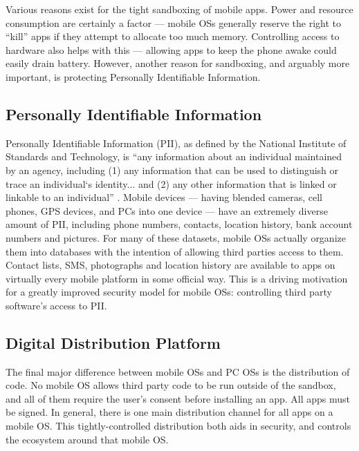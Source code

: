 Various reasons exist for the tight sandboxing of mobile apps. Power and resource consumption are certainly a factor --- mobile OSs generally reserve the right to ``kill'' apps if they attempt to allocate too much memory. Controlling access to hardware also helps with this --- allowing apps to keep the phone awake could easily drain battery. However, another reason for sandboxing, and arguably more important, is protecting Personally Identifiable Information.

\subsection{Personally Identifiable Information}

Personally Identifiable Information (PII), as defined by the National Institute of Standards and Technology, is ``any information about an individual maintained by an agency, including (1) any information that can be used to distinguish or trace an individual‘s identity... and (2) any other information that is linked or linkable to an individual'' \citep{mccallister2010guide}. Mobile devices --- having blended cameras, cell phones, GPS devices, and PCs into one device --- have an extremely diverse amount of PII, including phone numbers, contacts, location history, bank account numbers and pictures. For many of these datasets, mobile OSs actually organize them into databases with the intention of allowing third parties access to them. Contact lists, SMS, photographs and location history are available to apps on virtually every mobile platform in some official way. This is a driving motivation for a greatly improved security model for mobile OSs: controlling third party software's access to PII. 


\subsection{Digital Distribution Platform}

The final major difference between mobile OSs and PC OSs is the distribution of code. No mobile OS allows third party code to be run outside of the sandbox, and all of them require the user's consent before installing an app. All apps must be signed. In general, there is one main distribution channel for all apps on a mobile OS. This tightly-controlled distribution both aids in security, and controls the ecosystem around that mobile OS.


